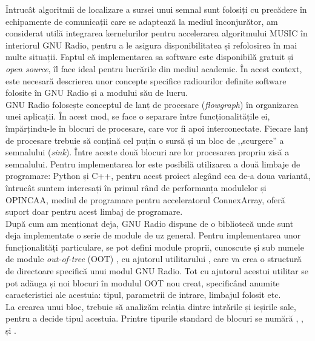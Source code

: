 Întrucât algoritmii de localizare a sursei unui semnal sunt folosiți cu
precădere în echipamente de comunicații care se adaptează la mediul
înconjurător, am considerat utilă integrarea kernelurilor pentru accelerarea
algoritmului MUSIC în interiorul GNU Radio, pentru a le asigura disponibilitatea
și refolosirea în mai multe situații. Faptul că implementarea sa software
este disponibilă gratuit și \textit{open source}, îl face ideal pentru
lucrările din mediul academic.  În acest context, este necesară descrierea unor
concepte specifice radiourilor definite software folosite în GNU Radio și a
modului său de lucru. \\

GNU Radio folosește conceptul de lanț de procesare (\textit{flowgraph}) în
organizarea unei aplicații. În acest mod, se face o separare între
funcționalitățile ei, împărțindu-le în blocuri de procesare, care vor fi apoi
interconectate. Fiecare lanț de procesare trebuie să conțină cel puțin o sursă
și un bloc de ,,scurgere'' a semnalului (\textit{sink}). Între aceste două
blocuri are lor procesarea propriu zisă a semnalului. Pentru implementarea lor
este posibilă utilizarea a două limbaje de programare: Python și C++, pentru
acest proiect alegând cea de-a doua variantă, întrucât suntem interesați în
primul rând de performanța modulelor și OPINCAA, mediul de programare pentru
acceleratorul ConnexArray, oferă suport doar pentru acest limbaj de programare. \\

După cum am menționat deja, GNU Radio dispune de o bibliotecă unde sunt deja
implementate o serie de module de uz general. Pentru implementarea unor
funcționalități particulare, se pot defini module proprii, cunoscute și sub
numele de module \textit{out-of-tree} (OOT) , cu
ajutorul utilitarului , care va crea o structură de directoare
specifică unui modul GNU Radio. Tot cu ajutorul acestui utilitar se pot adăuga
și noi blocuri în modulul OOT nou creat, specificând anumite caracteristici ale
acestuia: tipul, parametrii de intrare, limbajul folosit etc. \\

La crearea unui bloc, trebuie să analizăm relația dintre intrările și ieșirile
sale, pentru a decide tipul acestuia. Printre tipurile standard de blocuri se
numără , ,  și
.


